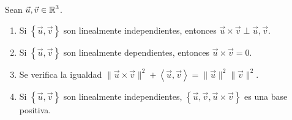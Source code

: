 \begin{prop} Sean $\displaystyle \vec{u}, \vec{v} \in \mathbb{R}^{3} $. 
\begin{enumerate}
	\item Si $\displaystyle \left\{ \vec{u}, \vec{v}\right\}  $ son linealmente independientes, entonces $\displaystyle \vec{u} \times \vec{v} \perp \vec{u}, \vec{v} $.  
	\item Si $\displaystyle \left\{ \vec{u}, \vec{v}\right\}  $ son linealmente dependientes, entonces $\displaystyle \vec{u} \times \vec{v} = 0 $. 
	\item Se verifica la igualdad $\displaystyle \|\vec{u} \times \vec{v}\|^{2} + \left\langle \vec{u}, \vec{v} \right\rangle =\|\vec{u}\|^{2}\|\vec{v}\|^{2} $.
	\item Si $\displaystyle \left\{ \vec{u}, \vec{v}\right\}  $ son linealmente independientes, $\displaystyle \left\{ \vec{u}, \vec{v}, \vec{u} \times \vec{v}\right\}  $ es una base positiva.  
\end{enumerate}
\end{prop}
